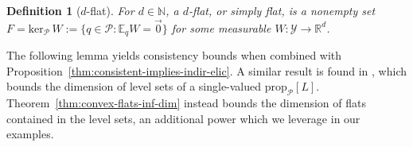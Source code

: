 \documentclass[11pt]{article} %
\newcommand{\Comments}{1}
\newcommand{\mytodo}[2]{\ifnum\Comments=1%
	\todo[linecolor=#1!80!black,backgroundcolor=#1,bordercolor=#1!80!black]{#2}\fi}
\newcommand{\raft}[1]{\mytodo{green!20!white}{RF: #1}}
\newcommand{\reals}{\mathbb{R}}
\newcommand{\prop}[2][\mathcal{P}]{\mathrm{prop}_{#1}[#2]}
\newcommand{\zeros}[1]{\mathrm{ker}_\P\,#1}
\newcommand{\E}{\mathbb{E}}
\renewcommand{\P}{\mathcal{P}}
\newcommand{\Y}{\mathcal{Y}}
\newtheorem{definition}{Definition}
\begin{document}
\begin{definition}[$d$-flat]\label{def:flat-general}
  For $d\in\mathbb N$, a \emph{$d$-flat}, or simply \emph{flat}, is a nonempty set $F = \zeros{W} := \{q \in \P : \E_q W = \vec 0\}$ for some measurable $W:\Y \to \reals^d$.
\end{definition}

The following lemma yields consistency bounds when combined with Proposition~\ref{thm:consistent-implies-indir-elic}. %
A similar result is found in \citet[Theorem 9]{agarwal2015consistent}, which bounds the dimension of level sets of a single-valued $\prop{L}$.
Theorem~\ref{thm:convex-flats-inf-dim} instead bounds the dimension of flats contained in the level sets, an additional power which we leverage in our examples.
\end{document}
